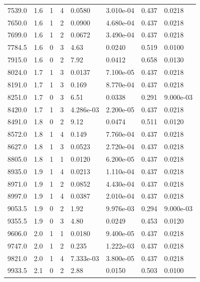 \documentclass[preview]{standalone}
\begin{document}
{{{\begin{tabular}{L{1.2cm}C{1.2cm} C{0.3cm}C{0.5cm} C{1.4cm}C{1.4cm} C{1.4cm}C{1.4cm}}
  7539.0  &   1.6  & 1     &  4 &  0.0580  & 3.010e-04  & 0.437 &  0.0218   \\ 
  7650.0  &   1.6  & 1     &  2 &  0.0900  & 4.680e-04  & 0.437 &  0.0218   \\ 
  7699.0  &   1.6  & 1     &  2 &  0.0672  & 3.490e-04  & 0.437 &  0.0218   \\ 
  7784.5  &   1.6  & 0     &  3 &  4.63  & 0.0240  & 0.519 &  0.0100   \\ 
  7915.0  &   1.6  & 0     &  2 &  7.92  & 0.0412  & 0.658 &  0.0130   \\ 
  8024.0  &   1.7  & 1     &  3 &  0.0137  & 7.100e-05  & 0.437 &  0.0218   \\ 
  8191.0  &   1.7  & 1     &  3 &  0.169  & 8.770e-04  & 0.437 &  0.0218   \\ 
  8251.0  &   1.7  & 0     &  3 &  6.51  & 0.0338  & 0.291 &  9.000e-03   \\ 
  8420.0  &   1.7  & 1     &  3 &  4.286e-03  & 2.200e-05  & 0.437 &  0.0218   \\ 
  8491.0  &   1.8  & 0     &  2 &  9.12  & 0.0474  & 0.511 &  0.0120   \\ 
  8572.0  &   1.8  & 1     &  4 &  0.149  & 7.760e-04  & 0.437 &  0.0218   \\ 
  8627.0  &   1.8  & 1     &  3 &  0.0523  & 2.720e-04  & 0.437 &  0.0218   \\ 
  8805.0  &   1.8  & 1     &  1 &  0.0120  & 6.200e-05  & 0.437 &  0.0218   \\ 
  8935.0  &   1.9  & 1     &  4 &  0.0213  & 1.110e-04  & 0.437 &  0.0218   \\ 
  8971.0  &   1.9  & 1     &  2 &  0.0852  & 4.430e-04  & 0.437 &  0.0218   \\ 
  8997.0  &   1.9  & 1     &  4 &  0.0387  & 2.010e-04  & 0.437 &  0.0218   \\ 
  9053.5  &   1.9  & 0     &  2 &  1.92  & 9.976e-03  & 0.294 &  9.000e-03   \\ 
  9355.5  &   1.9  & 0     &  3 &  4.80  & 0.0249  & 0.453 &  0.0120   \\ 
  9606.0  &   2.0  & 1     &  1 &  0.0180  & 9.400e-05  & 0.437 &  0.0218   \\ 
  9747.0  &   2.0  & 1     &  2 &  0.235  & 1.222e-03  & 0.437 &  0.0218   \\ 
  9821.0  &   2.0  & 1     &  4 &  7.333e-03  & 3.800e-05  & 0.437 &  0.0218   \\ 
  9933.5  &   2.1  & 0     &  2 &  2.88  & 0.0150  & 0.503 &  0.0100   \\ 

\end{tabular}}}}
\end{document}
